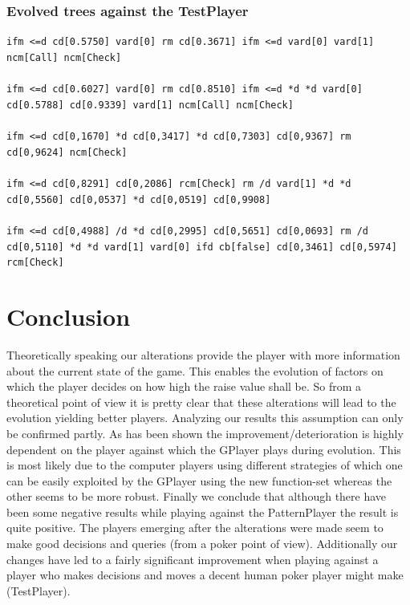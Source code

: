 \documentclass[12pt,fleqn,a4paper]{article}
\begin{document}
\subsubsection{Evolved trees against the TestPlayer}
\texttt{ifm <=d cd[0.5750] vard[0] rm cd[0.3671] ifm <=d vard[0] vard[1] ncm[Call] ncm[Check]} \\ \\
\texttt{ifm <=d cd[0.6027] vard[0] rm cd[0.8510] ifm <=d *d *d vard[0] cd[0.5788] cd[0.9339] vard[1] ncm[Call] ncm[Check]}\\ \\
\texttt{ifm <=d cd[0,1670] *d cd[0,3417] *d cd[0,7303] cd[0,9367] rm cd[0,9624] ncm[Check]}\\ \\
\texttt{ifm <=d cd[0,8291] cd[0,2086] rcm[Check] rm /d vard[1] *d *d cd[0,5560] cd[0,0537] *d cd[0,0519] cd[0,9908]}\\ \\
\texttt{ifm <=d cd[0,4988] /d *d cd[0,2995] cd[0,5651] cd[0,0693] rm /d cd[0,5110] *d *d vard[1] vard[0] ifd cb[false] cd[0,3461] cd[0,5974] rcm[Check]}

\newpage
\section{Conclusion}
Theoretically speaking our alterations provide the player with more information about the current state of the game. This enables the evolution of factors on which the player decides on how high the raise value
shall be. So from a theoretical point of view it is pretty clear that these alterations will lead to the evolution yielding better players. Analyzing our results this assumption can only be confirmed partly. As has been shown the improvement/deterioration is highly dependent on the player against which the GPlayer plays during evolution. This is most likely due to the computer players using different strategies of which one can be easily exploited by the GPlayer using the new function-set whereas the other seems to be more robust. Finally we conclude that although there have been some negative results while playing against the PatternPlayer the result is quite positive. The players emerging after the alterations were made seem to make good decisions and queries (from a poker point of view). Additionally our changes have led to a fairly significant improvement when playing against a player who makes decisions and moves a decent human poker player might make (TestPlayer). 
\end{document}
